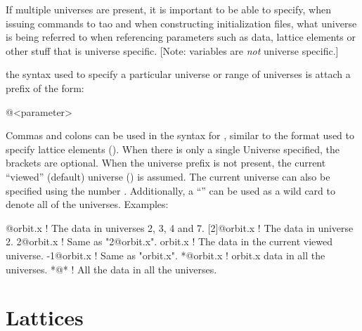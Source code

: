 If multiple universes are present, it is important to be able to
specify, when issuing commands to tao and when constructing \tao
initialization files, what universe is being referred to when
referencing parameters such as data, lattice elements or other stuff
that is universe specific. [Note: \tao variables are {\em not}
universe specific.]

the syntax used to specify a particular universe or range of universes
is attach a prefix of the form:
\begin{example}
  @<parameter>
\end{example}
Commas and colons can be used in the syntax for ,
similar to the  format used to specify lattice
elements ().  When there is only a single
Universe specified, the brackets \vn{[...]} are optional. When the
universe prefix is not present, the current ``viewed'' (default)
universe () is assumed. The current  universe
can also be specified using the number . Additionally, a
``\vn{*}'' can be used as a wild card to denote all of the
universes. Examples:
\begin{example}
  [2:4,7]@orbit.x ! The  data in universes 2, 3, 4 and 7.
  [2]@orbit.x     ! The  data in universe 2. 
  2@orbit.x       ! Same as "2@orbit.x".
  orbit.x         ! The  data in the current viewed universe.
  -1@orbit.x      ! Same as "orbit.x".
  *@orbit.x       ! orbit.x data in all the universes.
  *@*             ! All the data in all the universes. 
\end{example}

\section{Lattices}
\label{s:lattice}

